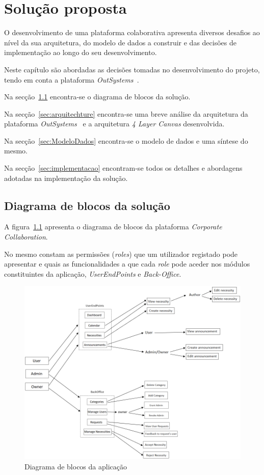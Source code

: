 \chapter{Solução proposta}\label{chapter:proposed_solution}

O desenvolvimento de uma plataforma colaborativa apresenta diversos desafios ao nível da sua arquitetura, 
do modelo de dados a construir e das decisões de implementação ao longo do seu desenvolvimento. 
\par
Neste capítulo são abordadas as decisões tomadas no desenvolvimento do projeto, tendo em conta a plataforma \textit{OutSystems~\cite{outsystems}}. 
\par
Na secção~\ref{sec:diagram} encontra-se o diagrama de blocos da solução.
\par
Na secção~\ref{sec:arquitechture} encontra-se uma breve análise da arquitetura da plataforma \textit{OutSystems~\cite{outsystems}} e a arquitetura \textit{4 Layer Canvas} desenvolvida.
\par
Na secção~\ref{sec:ModeloDados} encontra-se o modelo de dados e uma síntese do mesmo.
\par 
Na secção~\ref{sec:implementacao} encontram-se todos os detalhes e abordagens adotadas na implementação da solução.

\section{Diagrama de blocos da solução}\label{sec:diagram}
A figura~\ref{fig:diagram} apresenta o diagrama de blocos da plataforma \textit{Corporate Collaboration}. 
\par
No mesmo constam as permissões (\textit{roles}) que um utilizador registado pode apresentar e quais as funcionalidades a que cada \textit{role} pode aceder nos módulos constituintes da aplicação, \textit{UserEndPoints} e \textit{Back-Office}. 

\begin{figure}[H]
  \centering
  \includegraphics[scale=0.5]{figures/Diagrama de blocos.png}
  \caption{Diagrama de blocos da aplicação}\label{fig:diagram}
\end{figure}

